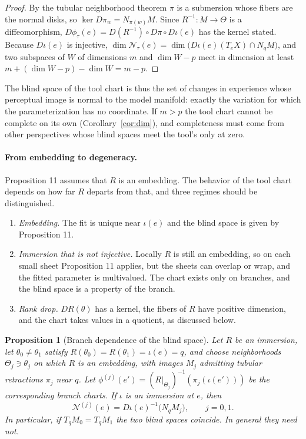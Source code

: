 \documentclass[11pt]{article}
\newtheorem{proposition}{Proposition}
\theoremstyle{remark}
\newcommand{\N}{\mathcal{N}}
\begin{document}
\begin{proof}
By the tubular neighborhood theorem $\pi$ is a submersion whose fibers are the normal disks, so $\ker D\pi_w=N_{\pi(w)}M$. Since $R^{-1}:M\to\Theta$ is a diffeomorphism, $D\phi_\tau(e)=D(R^{-1})\circ D\pi\circ D\iota(e)$ has the kernel stated. Because $D\iota(e)$ is injective, $\dim\N_\tau(e)=\dim\bigl(D\iota(e)(T_eX)\cap N_qM\bigr)$, and two subspaces of $W$ of dimensions $m$ and $\dim W-p$ meet in dimension at least $m+(\dim W-p)-\dim W=m-p$.
\end{proof}

The blind space of the tool chart is thus the set of changes in experience whose perceptual image is normal to the model manifold: exactly the variation for which the parameterization has no coordinate. If $m>p$ the tool chart cannot be complete on its own (Corollary~\ref{cor:dim}), and completeness must come from other perspectives whose blind spaces meet the tool's only at zero.

\paragraph{From embedding to degeneracy.} Proposition 11 assumes that $R$ is an embedding. The behavior of the tool chart depends on how far $R$ departs from that, and three regimes should be distinguished.
\begin{enumerate}[label=(\arabic*),nosep]
\item \emph{Embedding.} The fit is unique near $\iota(e)$ and the blind space is given by Proposition 11.
\item \emph{Immersion that is not injective.} Locally $R$ is still an embedding, so on each small sheet Proposition 11 applies, but the sheets can overlap or wrap, and the fitted parameter is multivalued. The chart exists only on branches, and the blind space is a property of the branch.
\item \emph{Rank drop.} $DR(\theta)$ has a kernel, the fibers of $R$ have positive dimension, and the chart takes values in a quotient, as discussed below.
\end{enumerate}

\begin{proposition}[Branch dependence of the blind space]
Let $R$ be an immersion, let $\theta_0\neq\theta_1$ satisfy $R(\theta_0)=R(\theta_1)=\iota(e)=q$, and choose neighborhoods $\Theta_j\ni\theta_j$ on which $R$ is an embedding, with images $M_j$ admitting tubular retractions $\pi_j$ near $q$. Let $\phi^{(j)}(e')=(R|_{\Theta_j})^{-1}(\pi_j(\iota(e')))$ be the corresponding branch charts. If $\iota$ is an immersion at $e$, then
\[
\N^{(j)}(e)=D\iota(e)^{-1}\bigl(N_qM_j\bigr),\qquad j=0,1.
\]
In particular, if $T_qM_0=T_qM_1$ the two blind spaces coincide. In general they need not.
\end{proposition}
\end{document}
